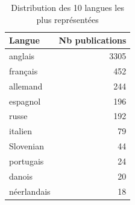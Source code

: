 \begin{table}
\caption{Distribution des 10 langues les plus représentées}
\label{tab:top_langues}
\begin{tabular}{lr}
\toprule
Langue & Nb publications \\
\midrule
anglais & 3305 \\
français & 452 \\
allemand & 244 \\
espagnol & 196 \\
russe & 192 \\
italien & 79 \\
Slovenian & 44 \\
portugais & 24 \\
danois & 20 \\
néerlandais & 18 \\
\bottomrule
\end{tabular}
\end{table}
